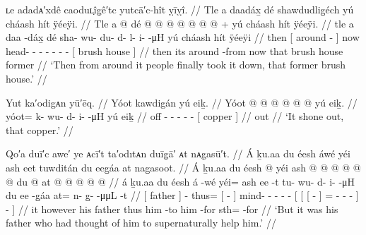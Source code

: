 \ex\label{ex:89-197-take-down-brush-house}%
%
\begingl
	\glpreamble	ʟe adadᴀ′xdê caoduʟ̣îg̣ê′tc yutcā′c-hît ỵīỵî. //
	\glpreamble	Tle a daadáx̱ dé shawdudlig̱éch yú cháash hít ÿéeÿi. //
	\gla	Tle {} a  @ {} {} dé
		 @ {} @ {} @ {} @ {} @ {} @ {} @ {} +
		{} yú cháash hít ÿéeÿi. {} //
	\glb	tle {} a daa -dáx̱ {} dé
		sha- wu- du- d- l- i-  -μH
		{} yú cháash hít ÿéeÿi {} //
	\glc	then {}[  around - {}] now
		head- - - - - -  -
		{}[  brush house  {}] //
	\gld	then {} its around -from {} now
		 {} {} {} {} {} {} {}
		{} that brush house former {} //
	\glft	‘Then from around it people finally took it down, that former brush house.’
		//
\endgl
\xe

\ex\label{ex:89-198-shone-out-copper}%
%
\begingl
	\glpreamble	Yut ka′odigᴀn yū′ēq. //
	\glpreamble	Yóot kawdigán yú eiḵ. //
	\gla	Yóot @  @ {} @ {} @ {} @ {} @ {}
		{} yú eiḵ. {} //
	\glb	yóot= k- wu- d- i-  -μH
		{} yú eiḵ {} //
	\glc	off - - - -  -
		{}[  copper {}] //
	\gld	out  {} {} {} {} {} //
	\glft	‘It shone out, that copper.’
		//
\endgl
\xe

\ex\label{ex:89-199-father-supernatural-help}%
%
\begingl
	\glpreamble	Qo′a duī′c awe′ ye ᴀcī′t ta′odıtᴀn duīg̣ā′ ᴀt nᴀg̣asū′t. //
	\glpreamble	Á ḵu.aa du éesh áwé yéi ash eet tuwditán du eeg̱áa at nag̱asoot. //
	\gla	Á ḵu.aa
		{} du éesh {}  @ {}
		yéi {} ash  @ {} {}
			 @ {} @ {} @ {} @ {} @ {}
		{} {} {} du  @ {} {}
			at @  @ {} @ {} @ {} @ {} {} {} {} //
	\glb	á ḵu.aa
		{} du éesh {} á -wé
		yéi= {} ash ee -t {}
			tu- wu- d- i-  -μH
		{} {} {} du ee -g̱áa {}
			at= n- g̱-  -μμL {} {} -t {} //
	\glc	{} 
		{}[  father {}]  -
		thus= {}[   - {}]
			mind- - - -  -
		{}[ {}[ {}[   - {}]
			= - -  - \· {}] - {}] //
	\gld	it however
		{} his father {}  {}
		thus {} him {} -to {}
			 {} {} {} {} {}
		{} {} {} him {} -for {}
			sth=  {} {} {} {} {} -for {} //
	\glft	‘But it was his father who had thought of him to supernaturally help him.’
		//
\endgl
\xe

